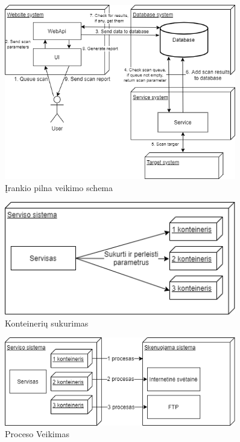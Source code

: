 \documentclass[a4paper,12pt,fleqn]{article}
\begin{document}
\begin{figure}[H]
	\centering
	\includegraphics[width=0.9\textwidth]{figs/Full.png}
	\caption{Įrankio pilna veikimo schema}
	\label{fig:full}
\end{figure}

\begin{figure}[H]
	\centering
	\includegraphics[width=0.9\textwidth]{figs/1Containerlt.png}
	\caption{Konteinerių sukurimas}
	\label{fig:1Container}
\end{figure}

\begin{figure}[H]
	\centering
	\includegraphics[width=0.9\textwidth]{figs/2Containerlt.png}
	\caption{Proceso Veikimas}
	\label{fig:2Container}
\end{figure}
\end{document}
